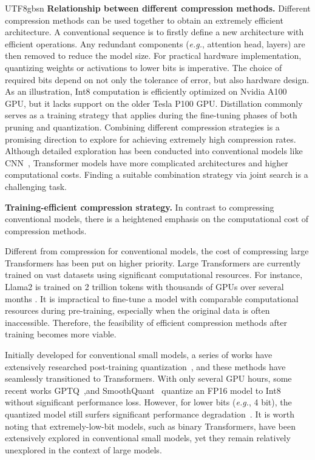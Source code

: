 \documentclass[10pt,journal,compsoc]{IEEEtran}
\newcommand{\eg}{\emph{e.g.}}
\newcommand{\<}{\left\langle}
\renewcommand{\>}{\right\rangle}
\newcommand{\1}{\mathbbm{1}}
\begin{document}
\begin{CJK}{UTF8}{gbsn}
\noindent\textbf{Relationship between different compression methods.}
Different compression methods can be used together to obtain an extremely efficient architecture.  A conventional sequence is to firstly define a new  architecture with efficient operations. Any redundant components (\eg, attention head, layers) are then removed to  reduce the model size. For practical hardware implementation, quantizing weights or activations to lower bits is imperative. The choice of required bits depend on not only the tolerance of error, but also  hardware design. As an illustration, Int8 computation is efficiently optimized on Nvidia A100 GPU, but it lacks support on the older Tesla P100 GPU. Distillation commonly serves as a training strategy that applies during the fine-tuning phases of both pruning and quantization. Combining different compression strategies is a promising direction to explore for achieving extremely high compression rates. Although detailed exploration has been conducted into conventional models like CNN~\cite{han2015deep,wang2020apq},  Transformer models have more complicated architectures and higher computational costs. Finding a suitable combination strategy via joint search is a challenging task.


\noindent\textbf{Training-efficient compression strategy.} 
In contrast to compressing conventional models, there is a heightened emphasis on the computational cost of compression methods. 

Different from compression for conventional models, the  cost of compressing large Transformers  has been put on higher priority. Large Transformers are currently trained on vast datasets using significant computational resources. For instance, Llama2 is trained on 2 trillion tokens with thousands of GPUs over several months \cite{touvron2023llama}. It is impractical to fine-tune a model with comparable computational resources during pre-training, especially when the original data is often inaccessible. Therefore, the feasibility of efficient compression methods after training becomes more viable.  %

Initially developed for conventional small models, a series of works have extensively researched post-training quantization~\cite{liu2021post, yuan2022ptq4vit,lin2021fq,ding2022towards}, and these methods have seamlessly transitioned to  Transformers. With only several GPU hours, some recent works GPTQ~\cite{frantar2022gptq},and SmoothQuant~\cite{xiao2023smoothquant} quantize an FP16 model to Int8 without significant performance loss.  However,  for lower bits (\eg, 4 bit), the quantized model still surfers significant performance degradation~\cite{frantar2022gptq,xiao2023smoothquant}. It is worth noting that extremely-low-bit models, such as binary Transformers, have been extensively explored in conventional small models,  yet they remain relatively unexplored in the context of large models.


\end{CJK}
\end{document}
